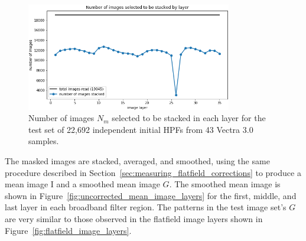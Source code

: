 \documentclass[letterpaper,11pt]{article}
\newcommand{\reffig}[1]{Figure~\ref{#1}}
\newcommand{\refsec}[1]{Section~\ref{#1}}
\newcommand{\Iota}{\mathrm{I}}
\begin{document}
\begin{figure}[!ht]
\centering
\includegraphics[width=0.80\textwidth]{images/results/n_images_stacked_per_layer_test_set}
\caption{\footnotesize Number of images $N_{m}$ selected to be stacked in each layer for the test set of 22,692 independent initial HPFs from 43 Vectra 3.0 samples.}
\label{fig:test_set_n_images_stacked}
\end{figure} 

The masked images are stacked, averaged, and smoothed, using the same procedure described in \refsec{sec:measuring_flatfield_corrections} to produce a mean image $\Iota$ and a smoothed mean image $G$. The smoothed mean image is shown in \reffig{fig:uncorrected_mean_image_layers} for the first, middle, and last layer in each broadband filter region. The patterns in the test image set's $G$ are very similar to those observed in the flatfield image layers shown in \reffig{fig:flatfield_image_layers}. 
\end{document}
